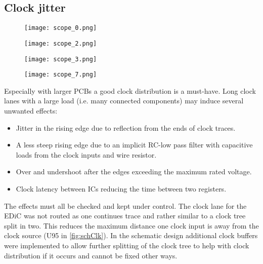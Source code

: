 \subsection{Clock jitter}\label{sec:eval_clock}
\begin{sidewaysfigure}[p]
  \centering
  \begin{subfigure}[b]{.45\textwidth}
    \texttt{[image: scope\_0.png]}
    \label{fig:clkDefault}
  \end{subfigure}%
  \hspace{.05\textwidth}
  \begin{subfigure}[b]{.45\textwidth}
    \texttt{[image: scope\_2.png]}
    \label{fig:clk33Ohm}
  \end{subfigure}

  \begin{subfigure}[b]{.45\textwidth}
    \texttt{[image: scope\_3.png]}
    \label{fig:clkTerm}
  \end{subfigure}%
  \hspace{.05\textwidth}
  \begin{subfigure}[b]{.45\textwidth}
    \texttt{[image: scope\_7.png]}
    \label{fig:clkLatency}
  \end{subfigure}
  \caption[Comparison of the clock rising edge in different configurations.]{Comparison of the rising edge of the clock in different configurations. Measured close to the clock buffer (yellow) and in \cref{fig:clkLatency} at the end of a clock lane (U204 pin 8) (green).}
\end{sidewaysfigure}
Especially with larger \glspl{PCB} a good clock distribution is a must-have.
Long clock lanes with a large load (i.e. many connected components) may induce several unwanted effects:
\begin{itemize}
  \item Jitter in the rising edge due to reflection from the ends of clock traces.
  \item A less steep rising edge due to an implicit RC-low pass filter with capacitive loads from the clock inputs and wire resistor.
  \item Over and undershoot after the edges exceeding the maximum rated voltage.
  \item Clock latency between \glspl{IC} reducing the time between two registers.
\end{itemize}
The effects must all be checked and kept under control.
The clock lane for the \gls{EDiC} was not routed as one continues trace and rather similar to a clock tree split in two.
This reduces the maximum distance one clock input is away from the clock source (U95 in \cref{fig:schClk}).
In the schematic design additional clock buffers were implemented to allow further splitting of the clock tree to help with clock distribution if it occurs and cannot be fixed other ways.

